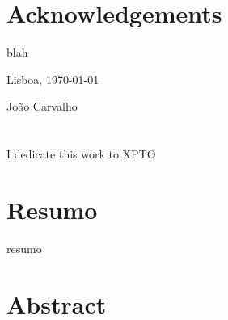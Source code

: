 \chapter*{Acknowledgements}
\thispagestyle{empty}

blah


\vfill
\begin{flushright}
  \begin{minipage}{8cm}
    \begin{center}
      Lisboa, \today

      Jo\~ao Carvalho
    \end{center}
  \end{minipage}
\end{flushright}

\newpage
\thispagestyle{empty}

\cleardoublepage


\chapter*{}
\thispagestyle{empty}

\vfill
\mbox{}
\vfill\large
\begin{flushright}
  \begin{minipage}{8cm}
    \begin{center}

I dedicate this work to XPTO

    \end{center}
  \end{minipage}
\end{flushright}
\normalsize\vfill
\newpage
\thispagestyle{empty}

\cleardoublepage



\chapter*{Resumo}
\thispagestyle{empty}

resumo

\newpage
\thispagestyle{empty}

\chapter*{Abstract}
\thispagestyle{empty}

